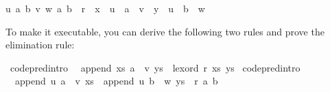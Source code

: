 \begin{isabellebody}
\begin{isamarkuptext}
\begin{isabelle}
u\ a\ b\ v\ w{}\ {}a{}\ b{}\ {}\ r\ {}\ x\ {}\ u\ {}\ a\ {}\ v\ {}\ y\ {}\ u\ {}\ b\ {}\ w{}{}%
\end{isabelle}%
\end{isamarkuptext}%
\isamarkuptrue%
%
\endisatagquote
{\isafoldquote}%
%
\isadelimquote
%
\endisadelimquote
%
\begin{isamarkuptext}%
\noindent To make it executable, you can derive the following two
  rules and prove the elimination rule:%
\end{isamarkuptext}%
\isamarkuptrue%
%
\isadelimquote
%
\endisadelimquote
%
\isatagquote
{}\isamarkupfalse%
\ {}code{}pred{}intro{}{}\isanewline
\ \ {}append\ xs\ {}a\ {}\ v{}\ ys\ {}\ lexord\ r\ {}xs{}\ ys{}{}\isanewline
{}\isamarkupfalse%
\ {}code{}pred{}intro{}{}\isanewline
\ \ {}append\ u\ {}a\ {}\ v{}\ xs\ {}\ append\ u\ {}b\ {}\ w{}\ ys\ {}\ r\ {}a{}\ b{}\isanewline

\end{isabellebody}
